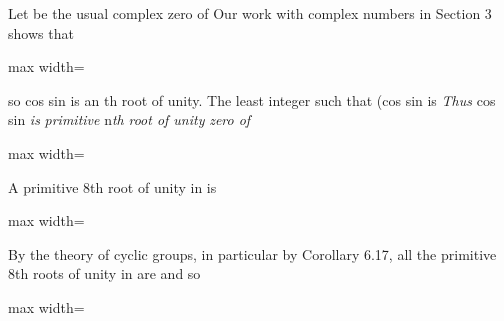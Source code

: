 \documentclass[11pt,oneside]{article}
\begin{document}
\begin{BookBody}
Let  be the usual complex zero of  Our work with complex numbers in Section 3 shows that

\begin{center}\begin{adjustbox}{max width=\linewidth}\end{adjustbox}\end{center}

\noindent so cos sin is an th root of unity. The least integer  such that (cos sin is  \textit{Thus} cos sin \textit{is}  \textit{primitive} n\textit{th} \textit{root of unity} \textit{zero of}

\begin{center}\begin{adjustbox}{max width=\linewidth}\end{adjustbox}\end{center}

 A primitive 8th root of unity in  is

\begin{center}\begin{adjustbox}{max width=\linewidth}\end{adjustbox}\end{center}

\noindent By the theory of cyclic groups, in particular by Corollary 6.17, all the primitive 8th roots of unity in  are  and  so

\begin{center}\begin{adjustbox}{max width=\linewidth}\end{adjustbox}\end{center}


\end{BookBody}
\end{document}
